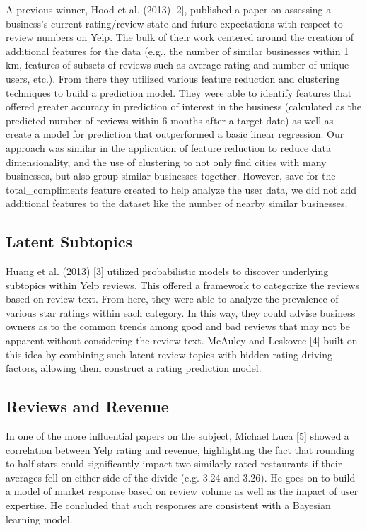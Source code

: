 \quad A previous winner, Hood et al. (2013) [2], published a paper on assessing a business’s current rating/review state and future expectations with respect to review numbers on Yelp. The bulk of their work centered around the creation of additional features for the data (e.g., the number of similar businesses within 1 km, features of subsets of reviews such as average rating and number of unique users, etc.). From there they utilized various feature reduction and clustering techniques to build a prediction model. They were able to identify features that offered greater accuracy in prediction of interest in the business (calculated as the predicted number of reviews within 6 months after a target date) as well as create a model for prediction that outperformed a basic linear regression. Our approach was similar in the application of feature reduction to reduce data dimensionality, and the use of clustering to not only find cities with many businesses, but also group similar businesses together. However, save for the total_compliments feature created to help analyze the user data, we did not add additional features to the dataset like the number of nearby similar businesses.

\subsection{Latent Subtopics}

\quad Huang et al. (2013) [3] utilized probabilistic models to discover underlying subtopics within Yelp reviews. This offered a framework to categorize the reviews based on review text. From here, they were able to analyze the prevalence of various star ratings within each category. In this way, they could advise business owners as to the common trends among good and bad reviews that may not be apparent without considering the review text. McAuley and Leskovec [4] built on this idea by combining such latent review topics with hidden rating driving factors, allowing them construct a rating prediction model.

\subsection{Reviews and Revenue}

\quad In one of the more influential papers on the subject, Michael Luca [5] showed a correlation between Yelp rating and revenue, highlighting the fact that rounding to half stars could significantly impact two similarly-rated restaurants if their averages fell on either side of the divide (e.g. 3.24 and 3.26). He goes on to build a model of market response based on review volume as well as the impact of user expertise. He concluded that such responses are consistent with a Bayesian learning model.

